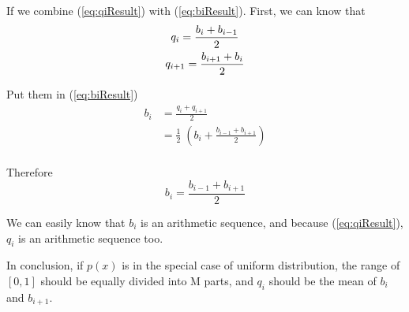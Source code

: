 \documentclass{article}
\begin{document}
If we combine (\ref{eq:qiResult}) with (\ref{eq:biResult}). First, we can know that 
\begin{gather}
	q_i = \frac{b_i + b_{i - 1}}{2} \notag \\ 
	q_{i + 1} = \frac{b_{i + 1} + b_i}{2} \notag
\end{gather}

Put them in (\ref{eq:biResult})
\begin{equation*}
	\begin{aligned}
		b_i &= \frac{q_i + q_{i + 1}}{2} \\ 
		&= \frac{1}{2} \; (b_i + \frac{b_{i - 1} + b_{i + 1}}{2}) \\ 
	\end{aligned}
\end{equation*}

Therefore
$$
	b_i = \frac{b_{i - 1} + b_{i + 1}}{2}
$$

We can easily know that $b_i$ is an arithmetic sequence, and because (\ref{eq:qiResult}), $q_i$ is an arithmetic sequence too. 

In conclusion, if $p(x)$ is in the special case of uniform distribution, the range of $[0, 1]$ should be equally divided into M parts, and $q_i$ should be the mean of $b_i$ and $b_{i + 1}$.



\end{document}
